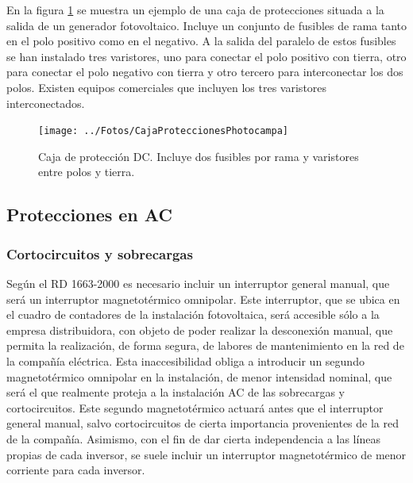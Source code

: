 En la figura \ref{fig:Caja-de-protecci=0000F3n} se muestra un ejemplo
de una caja de protecciones situada a la salida de un generador fotovoltaico.
Incluye un conjunto de fusibles de rama tanto en el polo positivo
como en el negativo. A la salida del paralelo de estos fusibles se
han instalado tres varistores, uno para conectar el polo positivo
con tierra, otro para conectar el polo negativo con tierra y otro
tercero para interconectar los dos polos. Existen equipos comerciales
que incluyen los tres varistores interconectados.

%
\begin{figure}
\begin{centering}
\texttt{[image: ../Fotos/CajaProteccionesPhotocampa]}
\end{centering}

\caption[Caja de protección DC]{Caja de protección DC. Incluye dos fusibles por rama y varistores
entre polos y tierra.\label{fig:Caja-de-protecci=0000F3n}}

\end{figure}



\subsection{Protecciones en AC}


\subsubsection{Cortocircuitos y sobrecargas}

Según el RD 1663-2000 \citep{RealDecreto2000} es necesario incluir
un interruptor general manual, que será un interruptor magnetotérmico
omnipolar. Este interruptor, que se ubica en el cuadro de contadores
de la instalación fotovoltaica, será accesible sólo a la empresa distribuidora,
con objeto de poder realizar la desconexión manual, que permita la
realización, de forma segura, de labores de mantenimiento en la red
de la compañía eléctrica. Esta inaccesibilidad obliga a introducir
un segundo magnetotérmico omnipolar en la instalación, de menor intensidad
nominal, que será el que realmente proteja a la instalación AC de
las sobrecargas y cortocircuitos. Este segundo magnetotérmico actuará
antes que el interruptor general manual, salvo cortocircuitos de cierta
importancia provenientes de la red de la compañía. Asimismo, con el
fin de dar cierta independencia a las líneas propias de cada inversor,
se suele incluir un interruptor magnetotérmico de menor corriente
para cada inversor.

